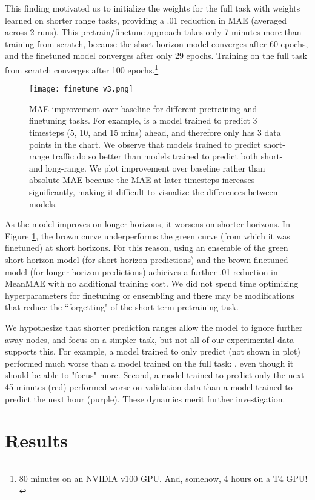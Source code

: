 \documentclass[10pt]{article}
\begin{document}
This finding motivated us to initialize the weights for the full task with weights learned on shorter range tasks, providing a .01 reduction in MAE (averaged across 2 runs). This pretrain/finetune approach takes only 7 minutes more than training from scratch, because the short-horizon model converges after 60 epochs, and the finetuned model converges after only 29 epochs. Training on the full task from scratch converges after 100 epochs.\footnote{80 minutes on an NVIDIA v100 GPU. And, somehow, 4 hours on a T4 GPU!}

\begin{figure}[h]
    \centering
\texttt{[image: finetune\_v3.png]}
\caption{MAE improvement over baseline for different pretraining and finetuning tasks. For example,  is a model trained to predict 3 timesteps (5, 10, and 15 mins) ahead, and therefore only has 3 data points in the chart. We observe that models trained to predict short-range traffic do so better than models trained to predict both short- and long-range. We plot improvement over baseline rather than absolute MAE because the MAE at later timesteps increases significantly, making it difficult to visualize the differences between models.}
\label{transfer_learning}
\end{figure}

As the model improves on longer horizons, it worsens on shorter horizons. In Figure \ref{transfer_learning}, the brown curve underperforms the green curve (from which it was finetuned) at short horizons. For this reason, using an ensemble of the green short-horizon model (for short horizon predictions) and the brown finetuned model (for longer horizon predictions) achieives a further .01 reduction in MeanMAE with no additional training cost. We did not spend time optimizing hyperparameters for finetuning or ensembling and there may be modifications that reduce the ``forgetting" of the short-term pretraining task.

We hypothesize that shorter prediction ranges allow the model to ignore further away nodes, and focus on a simpler task, but not all of our experimental data supports this. For example, a model trained to only predict  (not shown in plot) performed much worse than a model trained on the full task: , even though it should be able to "focus" more. Second, a model trained to predict only the next 45 minutes (red) performed worse on validation data than a model trained to predict the next hour (purple). These dynamics merit further investigation.

\section{Results}
\end{document}
